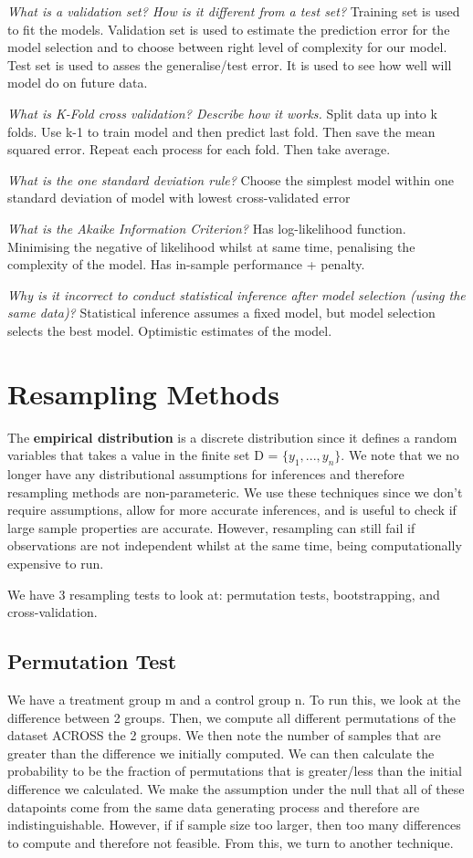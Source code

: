\documentclass[11pt, oneside]{article}
\theoremstyle{definition}
\begin{document}
\textit{What is a validation set? How is it different from a test set?}
Training set is used to fit the models. Validation set is used to estimate the prediction error for the model selection and to choose between right level of complexity for our model. Test set is used to asses the generalise/test error. It is used to see how well will model do on future data.

\textit{What is K-Fold cross validation? Describe how it works.}
Split data up into k folds. Use k-1 to train model and then predict last fold. Then save the mean squared error. Repeat each process for each fold. Then take average.

\textit{What is the one standard deviation rule?}
Choose the simplest model within one standard deviation of model with lowest cross-validated error

\textit{What is the Akaike Information Criterion?}
Has log-likelihood function. Minimising the negative of likelihood whilst at same time, penalising the complexity of the model. Has in-sample performance + penalty.

\textit{Why is it incorrect to conduct statistical inference after model selection (using the same data)?}
Statistical inference assumes a fixed model, but model selection selects the best model. Optimistic estimates of the model.

\newpage
\section{Resampling Methods}
The \textbf{empirical distribution} is a discrete distribution since it defines a random variables that takes a value in the finite set D = $\{y_1,...,y_n\}$. We note that we no longer have any distributional assumptions for inferences and therefore resampling methods are non-parameteric. We use these techniques since we don't require assumptions, allow for more accurate inferences, and is useful to check if large sample properties are accurate. However, resampling can still fail if observations are not independent whilst at the same time, being computationally expensive to run.

We have 3 resampling tests to look at: permutation tests, bootstrapping, and cross-validation.
\subsection{Permutation Test}
We have a treatment group m and a control group n. To run this, we look at the difference between 2 groups. Then, we compute all different permutations of the dataset ACROSS the 2 groups. We then note the number of samples that are greater than the difference we initially computed. We can then calculate the probability to be the fraction of permutations that is greater/less than the initial difference we calculated. We make the assumption under the null that all of these datapoints come from the same data generating process and therefore are indistinguishable. However, if if sample size too larger, then too many differences to compute and therefore not feasible. From this, we turn to another technique.
\end{document}
